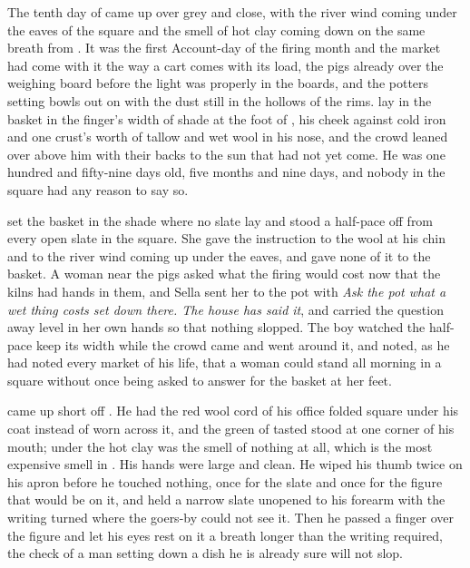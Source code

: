 
The tenth day of  came up over  grey and close, with the river wind coming under the eaves of the square and the smell of hot clay coming down on the same breath from . It was the first Account-day of the firing month and the market had come with it the way a cart comes with its load, the pigs already over the weighing board before the light was properly in the boards, and the potters setting bowls out on  with the dust still in the hollows of the rims.  lay in the basket in the finger's width of shade at the foot of , his cheek against cold iron and one crust's worth of tallow and wet wool in his nose, and the crowd leaned over  above him with their backs to the sun that had not yet come. He was one hundred and fifty-nine days old, five months and nine days, and nobody in the square had any reason to say so.

 set the basket in the shade where no slate lay and stood a half-pace off from every open slate in the square. She gave the instruction to the wool at his chin and to the river wind coming up under the eaves, and gave none of it to the basket. A woman near the pigs asked what the firing would cost now that the kilns had hands in them, and Sella sent her to the pot with \emph{Ask the pot what a wet thing costs set down there. The house has said it}, and carried the question away level in her own hands so that nothing slopped. The boy watched the half-pace keep its width while the crowd came and went around it, and noted, as he had noted every market of his life, that a woman could stand all morning in a square without once being asked to answer for the basket at her feet.

 came up short off . He had the red wool cord of his office folded square under his coat instead of worn across it, and the green of tasted  stood at one corner of his mouth; under the hot clay was the smell of nothing at all, which is the most expensive smell in . His hands were large and clean. He wiped his thumb twice on his apron before he touched nothing, once for the slate and once for the figure that would be on it, and held a narrow slate unopened to his forearm with the writing turned where the goers-by could not see it. Then he passed a finger over the figure and let his eyes rest on it a breath longer than the writing required, the check of a man setting down a dish he is already sure will not slop.

